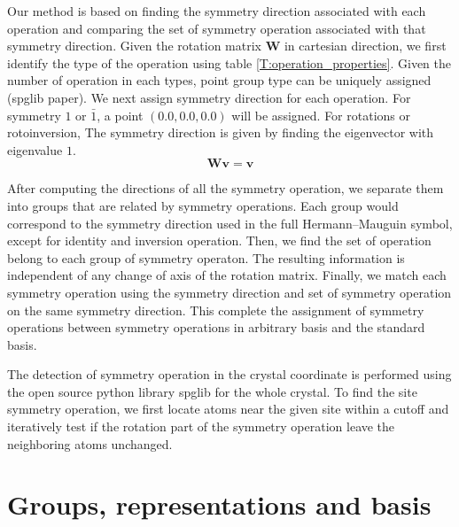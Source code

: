 \documentclass{article}
\begin{document}
Our method is based on finding the symmetry direction associated with each operation and comparing the set of symmetry operation
associated with that symmetry direction. Given the rotation matrix $\mathbf{W}$ in cartesian direction, 
we first identify the type of the operation using table \ref{T:operation_properties}. 
Given the number of operation in each types, point group type can be uniquely assigned (spglib paper). 
We next assign symmetry direction for each operation.
For symmetry $1$ or $\bar{1}$, a point $(0.0, 0.0, 0.0)$ will be assigned. For rotations 
or rotoinversion, The symmetry direction is given by finding the eigenvector with eigenvalue $1$. 
\begin{equation}
    \mathbf{W}\mathbf{v} = \mathbf{v}
\end{equation}

After computing the directions of all the symmetry operation, we separate them into groups that are related by symmetry operations. 
Each group would correspond to the symmetry direction used in the full Hermann--Mauguin symbol, except for identity and inversion operation. 
Then, we find the set of operation belong to each group of symmetry operaton. 
The resulting information is independent of any change of axis of the rotation matrix. 
Finally, we match each symmetry operation using the symmetry direction and set of symmetry operation on the same symmetry direction. 
This complete the assignment of symmetry operations between symmetry operations in arbitrary basis and the standard basis. 

The detection of symmetry operation in the crystal coordinate is performed using the open source python library spglib for the 
whole crystal. To find the site symmetry operation, we first locate atoms near the given site within a cutoff and iteratively 
test if the rotation part of the symmetry operation leave the neighboring atoms unchanged. 




\section{Groups, representations and basis}
\end{document}
